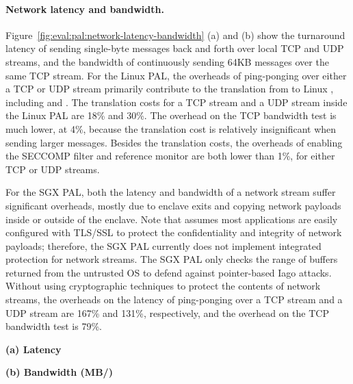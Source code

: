




\paragraph{Network latency and bandwidth.}
Figure~\ref{fig:eval:pal:network-latency-bandwidth} (a) and (b) show the turnaround latency of sending single-byte messages back and forth over local TCP and UDP streams, and the bandwidth of continuously sending 64KB messages over the same TCP stream.
For the Linux PAL,
the overheads of ping-ponging over either a TCP or UDP stream primarily contribute to the translation from \hostapis{} to Linux \linuxapis{}, including  and .
The translation costs for a TCP stream and a UDP stream inside the Linux PAL are \roughly{}18\% and \roughly{}30\%.
The overhead on the TCP bandwidth test is much lower,
at \roughly{}4\%, because the translation cost is relatively insignificant when sending larger messages. 
Besides the translation costs, the overheads of enabling the SECCOMP filter and reference monitor are both lower than 1\%, for either TCP or UDP streams.


For the SGX PAL, both the latency and bandwidth of a network stream suffer significant overheads, mostly due to enclave exits and copying network payloads inside or outside of the enclave. Note that \graphenesgx{} assumes most applications are easily configured with TLS/SSL to protect the confidentiality and integrity of network payloads; therefore, the SGX PAL currently does not implement integrated protection for network streams. The SGX PAL only checks the range of buffers
returned from the untrusted OS
to defend against pointer-based Iago attacks.
Without using cryptographic techniques to protect the contents of network streams, the overheads on the latency of ping-ponging over a TCP stream and a UDP stream are \roughly{}167\% and \roughly{}131\%, respectively, and the overhead on the TCP bandwidth test is \roughly{}79\%. 

\begin{figure*}[t!]
\centering
\footnotesize
{}
\parbox{0.59\textwidth}{\centering\bf (a) Latency {\usec}}
\parbox{0.39\textwidth}{\centering\bf (b) Bandwidth (MB/\asec{})}
\caption{Latency of TCP and UDP ping-ponging, and bandwidth over a TCP stream.
The comparison is between (1) \linuxapis{} in a native Linux process; (2) \hostapis{} on a Linux PAL, with the options of enabling the SECCOMP filter ({\bf +SC}) and reference monitor ({\bf +RM}); (3) \hostapis{} in an enclave, without any shielding mechanisms.}
\label{fig:eval:pal:network-latency-bandwidth}
\end{figure*}





